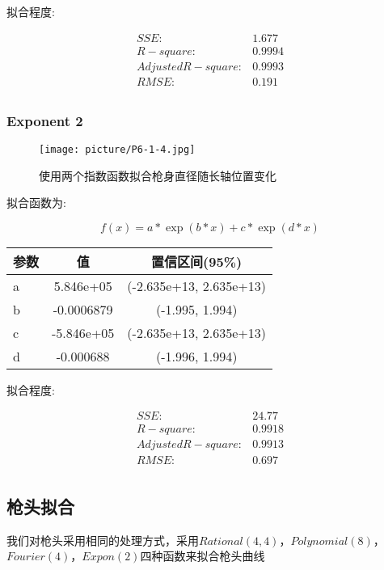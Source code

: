 \documentclass[UTF8]{ctexart}
\begin{document}
			\begin{flushleft}
				拟合程度:
			\end{flushleft}
			\begin{center}
				$$
				\begin{matrix}
				SSE:&1.677\\
				R-square:&0.9994\\
				Adjusted R-square:&0.9993\\
				RMSE:&0.191\\
				\end{matrix}
				$$
			\end{center}
			\subsubsection{Exponent 2}
			\begin{figure}[h]
				\texttt{[image: picture/P6-1-4.jpg]}
				\caption{使用两个指数函数拟合枪身直径随长轴位置变化}
			\end{figure}
			\begin{flushleft}
				拟合函数为:
			\end{flushleft}
			\begin{center}
				$$  f(x) = a*\exp(b*x) + c*\exp(d*x)$$		
				\begin{tabular}{|l|c|c|}
					\hline
					参数&值&置信区间(95\%)\\
					\hline
					a &   5.846e+05&  (-2.635e+13, 2.635e+13)\\
					\hline
					b &  -0.0006879&  (-1.995, 1.994)\\
					\hline
					c &  -5.846e+05&  (-2.635e+13, 2.635e+13)\\
					\hline
					d &   -0.000688&  (-1.996, 1.994)\\
					\hline				
				\end{tabular}
			\end{center}
			\begin{flushleft}
				拟合程度:
			\end{flushleft}
			\begin{center}
				$$
				\begin{matrix}
				SSE:&24.77\\
				R-square:&0.9918\\
				Adjusted R-square:&0.9913\\
				RMSE:&0.697\\
				\end{matrix}
				$$
			\end{center}
			\subsection{枪头拟合}我们对枪头采用相同的处理方式，采用$Rational(4,4)$，$Polynomial(8)$，$Fourier(4)$，$Expon(2)$四种函数来拟合枪头曲线
\end{document}
